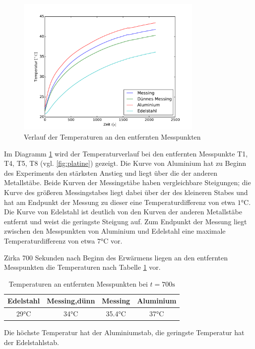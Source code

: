 \begin{figure}[p]
	\label{fig:entftemp}
	\centering
	\includegraphics[width=0.8\textwidth]{Bilder/M1_Tempverl.pdf}
	\caption{Verlauf der Temperaturen an den entfernten Messpunkten}
\end{figure}
Im Diagramm \ref{fig:entftemp} wird der Temperaturverlauf bei den entfernten Messpunkte T1, T4, T5, T8 (vgl. \ref{fig:platine}) gezeigt. 
Die Kurve von Aluminium hat zu Beginn des Experiments den stärksten Anstieg und liegt über die der anderen Metallstäbe. 
Beide Kurven der Messingstäbe haben vergleichbare Steigungen;
die Kurve des größeren Messingstabes liegt dabei über der des kleineren Stabes und hat am Endpunkt der Messung zu dieser eine Temperaturdifferenz von etwa $1 \si{\degreeCelsius}$. 
Die Kurve von Edelstahl ist deutlich von den Kurven der anderen Metallstäbe entfernt und weist die geringste Steigung auf. 
Zum Endpunkt der Messung liegt zwischen den Messpunkten von Aluminium und Edelstahl eine maximale Temperaturdifferenz von etwa $7 \si{\degreeCelsius}$ vor. 

Zirka 700 Sekunden nach Beginn des Erwärmens liegen an den entfernten Messpunkten die Temperaturen nach Tabelle \ref{tab:700} vor. 
\begin{table}[h!]
\centering
\begin{tabular}{cccc}
	\toprule
	{Edelstahl}&{Messing,dünn}&{Messing}&{Aluminium}\\
	\midrule
	29$\si{\degreeCelsius}$& 34$\si{\degreeCelsius}$& 35.4$\si{\degreeCelsius}$& 37$\si{\degreeCelsius}$\\
	\bottomrule
\end{tabular}
\label{tab:700}
\caption{Temperaturen an entfernten Messpunkten bei $t=700\si{\second}$}
\end{table}
Die höchste Temperatur hat der Aluminiumstab, die geringste Temperatur hat der Edelstahlstab.

